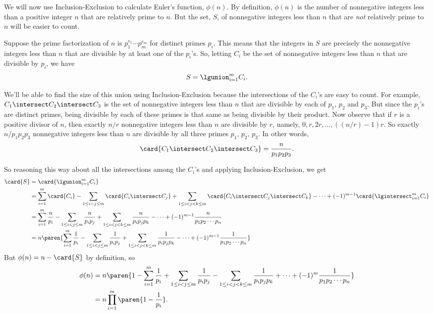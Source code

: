 We will now use Inclusion-Exclusion to calculate Euler's function,
$\phi(n)$.  By definition, $\phi(n)$ is the number of nonnegative integers
less than a positive integer $n$ that are relatively prime to $n$.  But
the set, $S$, of nonnegative integers less than $n$ that are \emph{not}
relatively prime to $n$ will be easier to count.

Suppose the prime factorization of $n$ is $p_1^{e_1}\cdots p_m^{e_m}$
for distinct primes $p_i$.  This means that the integers in $S$ are
precisely the nonnegative integers less than $n$ that are divisible by at
least one of the $p_i$'s.  So, letting $C_i$ be the set of nonnegative
integers less than $n$ that are divisible by $p_i$, we have
\[
S = \lgunion_{i=1}^m C_i.
\]

We'll be able to find the size of this union using Inclusion-Exclusion
because the intersections of the $C_i$'s are easy to count.  For example,
$C_1 \intersect C_2 \intersect C_3$ is the set of nonnegative integers less
than $n$ that are divisible by each of $p_1$, $p_2$ and $p_3$.  But since
the $p_i$'s are distinct primes, being divisible by each of these primes is
that same as being divisible by their product.  Now observe that if $r$ is
a positive divisor of $n$, then exactly $n/r$ nonnegative integers less
than $n$ are divisible by $r$, namely, $0,r,2r,\dots,((n/r)-1)r$.  So
exactly $n/p_1p_2p_3$ nonnegative integers less than $n$ are divisible by
all three primes $p_1$, $p_2$, $p_3$.  In other words,
\[
\card{C_1 \intersect C_2 \intersect C_3} = \frac{n}{p_1p_2p_3}.
\]

So reasoning this way about all the intersections among the $C_i$'s and
applying Inclusion-Exclusion, we get
\begin{align*}
\card{S}
  & = \card{\lgunion_{i=1}^m C_i}\\
  & = \sum_{i=1}^m \card{C_i} - \sum_{1\leq i < j \leq m} \card{C_i \intersect C_j}
       + \sum_{1\leq i < j < k \leq m} \card{C_i \intersect C_j \intersect C_k} -
       \cdots + (-1)^{m-1} \card{\lgintersect_{i=1}^m C_i}\\
  & = \sum_{i=1}^m \frac{n}{p_i} -
      \sum_{1\leq i < j \leq m} \frac{n}{p_ip_j}
       + \sum_{1\leq i < j < k \leq m} \frac{n}{p_ip_jp_k} - \cdots
        + (-1)^{m-1} \frac{n}{p_1p_2\cdots p_n}\\
  & = n\paren{\sum_{i=1}^m \frac{1}{p_i} -
      \sum_{1\leq i < j \leq m} \frac{1}{p_ip_j}
       + \sum_{1\leq i < j < k \leq m} \frac{1}{p_ip_jp_k} - \cdots
        + (-1)^{m-1} \frac{1}{p_1p_2\cdots p_n}}
\end{align*}
But $\phi(n)=n-\card{S}$ by definition, so
\begin{align}
  \phi(n) & = n\paren{1 - \sum_{i=1}^m \frac{1}{p_i} +  \sum_{1\leq i < j \leq m} \frac{1}{p_ip_j}
    - \sum_{1\leq i < j < k \leq m} \frac{1}{p_ip_jp_k} + \cdots
    + (-1)^m\frac{1}{p_1p_2\cdots p_n}}\notag\\
          &  = n \prod_{i=1}^m \paren{1 - \frac{1}{p_i}}.\label{inex-phi}
\end{align}

